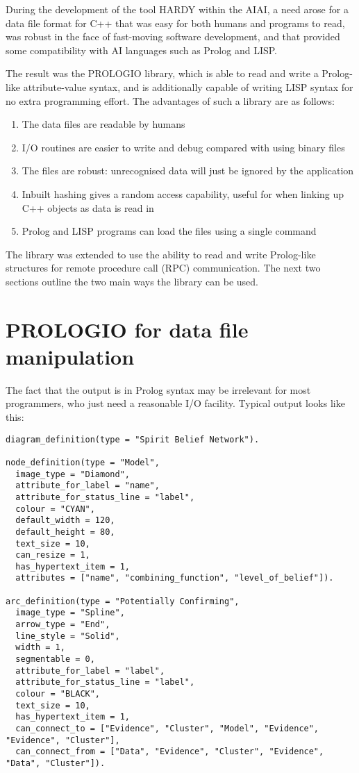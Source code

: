 During the development of the tool HARDY within the AIAI, a need arose
for a data file format for C++ that was easy for both humans and
programs to read, was robust in the face of fast-moving software
development, and that provided some compatibility with AI languages
such as Prolog and LISP.

The result was the PROLOGIO library, which is able to read and write a
Prolog-like attribute-value syntax, and is additionally capable of
writing LISP syntax for no extra programming effort.  The advantages of
such a library are as follows:

\begin{enumerate}
\item The data files are readable by humans
\item I/O routines are easier to write and debug compared with using binary files
\item The files are robust: unrecognised data will just be ignored by the application
\item Inbuilt hashing gives a random access capability, useful for when linking
up C++ objects as data is read in
\item Prolog and LISP programs can load the files using a single command
\end{enumerate}

The library was extended to use the ability to read and write
Prolog-like structures for remote procedure call (RPC) communication.
The next two sections outline the two main ways the library can be used.

\section{PROLOGIO for data file manipulation}

The fact that the output is in Prolog syntax may be irrelevant for most
programmers, who just need a reasonable I/O facility.  Typical output
looks like this:

\begin{verbatim}
diagram_definition(type = "Spirit Belief Network").

node_definition(type = "Model",
  image_type = "Diamond",
  attribute_for_label = "name",
  attribute_for_status_line = "label",
  colour = "CYAN",
  default_width = 120,
  default_height = 80,
  text_size = 10,
  can_resize = 1,
  has_hypertext_item = 1,
  attributes = ["name", "combining_function", "level_of_belief"]).

arc_definition(type = "Potentially Confirming",
  image_type = "Spline",
  arrow_type = "End",
  line_style = "Solid",
  width = 1,
  segmentable = 0,
  attribute_for_label = "label",
  attribute_for_status_line = "label",
  colour = "BLACK",
  text_size = 10,
  has_hypertext_item = 1,
  can_connect_to = ["Evidence", "Cluster", "Model", "Evidence", "Evidence", "Cluster"],
  can_connect_from = ["Data", "Evidence", "Cluster", "Evidence", "Data", "Cluster"]).
\end{verbatim}

